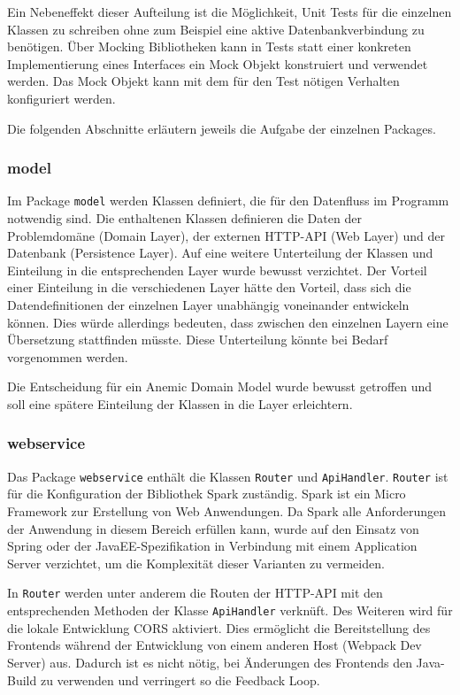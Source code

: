 \documentclass[
ngerman          %
,a4paper          %
,11pt
,pdftex
]{report}
\begin{document}
Ein Nebeneffekt dieser Aufteilung ist die Möglichkeit, Unit Tests für die einzelnen Klassen zu schreiben ohne zum Beispiel eine aktive Datenbankverbindung zu benötigen. Über Mocking Bibliotheken kann in Tests statt einer konkreten Implementierung eines Interfaces ein Mock Objekt konstruiert und verwendet werden. Das Mock Objekt kann mit dem für den Test nötigen Verhalten konfiguriert werden.

Die folgenden Abschnitte erläutern jeweils die Aufgabe der einzelnen Packages.

\subsubsection{model}
\label{sec:model}

Im Package \texttt{model} werden Klassen definiert, die für den Datenfluss im Programm notwendig sind. Die enthaltenen Klassen definieren die Daten der Problemdomäne (Domain Layer), der externen \ac{HTTP}-\ac{API} (Web Layer) und der Datenbank (Persistence Layer). Auf eine weitere Unterteilung der Klassen und Einteilung in die entsprechenden Layer wurde bewusst verzichtet. Der Vorteil einer Einteilung in die verschiedenen Layer hätte den Vorteil, dass sich die Datendefinitionen der einzelnen Layer unabhängig voneinander entwickeln können. Dies würde allerdings bedeuten, dass zwischen den einzelnen Layern eine Übersetzung stattfinden müsste. Diese Unterteilung könnte bei Bedarf vorgenommen werden.

Die Entscheidung für ein Anemic Domain Model wurde bewusst getroffen und soll eine spätere Einteilung der Klassen in die Layer erleichtern.

\subsubsection{webservice}
\label{sec:webservice}

Das Package \texttt{webservice} enthält die Klassen \texttt{Router} und \texttt{ApiHandler}. \texttt{Router} ist für die Konfiguration der Bibliothek Spark zuständig. Spark ist ein Micro Framework zur Erstellung von Web Anwendungen. Da Spark alle Anforderungen der Anwendung in diesem Bereich erfüllen kann, wurde auf den Einsatz von Spring oder der JavaEE-Spezifikation in Verbindung mit einem Application Server verzichtet, um die Komplexität dieser Varianten zu vermeiden.

In \texttt{Router} werden unter anderem die Routen der \ac{HTTP}-\ac{API} mit den entsprechenden Methoden der Klasse \texttt{ApiHandler} verknüft. Des Weiteren wird für die lokale Entwicklung \ac{CORS} aktiviert. Dies ermöglicht die Bereitstellung des Frontends während der Entwicklung von einem anderen Host (Webpack Dev Server) aus. Dadurch ist es nicht nötig, bei Änderungen des Frontends den Java-Build zu verwenden und verringert so die Feedback Loop.
\end{document}
